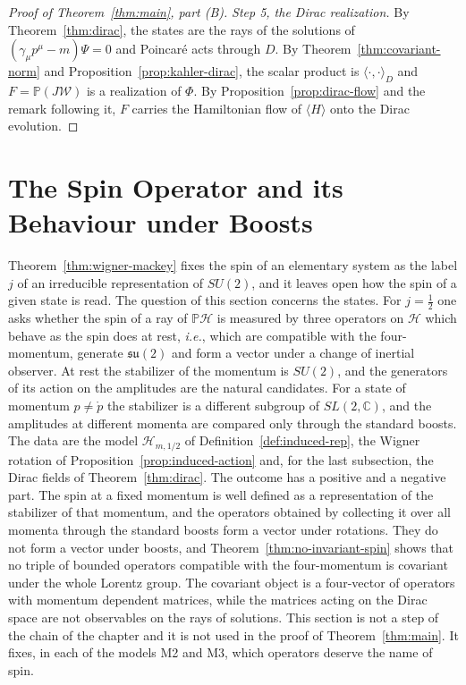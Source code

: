 \begin{proof}[Proof of Theorem~\ref{thm:main}, part (B)]
	\emph{Step 5, the Dirac realization.} By Theorem~\ref{thm:dirac}, the states are the rays of the solutions of $(\gamma_\mu p^\mu-m)\Psi=0$ and Poincar\'e acts through $D$. By Theorem~\ref{thm:covariant-norm} and Proposition~\ref{prop:kahler-dirac}, the scalar product is $\langle\cdot,\cdot\rangle_D$ and $F=\mathbb{P}(J\mathcal{W})$ is a realization of $\Phi$. By Proposition~\ref{prop:dirac-flow} and the remark following it, $F$ carries the Hamiltonian flow of $\langle H\rangle$ onto the Dirac evolution.
\end{proof}
\section{The Spin Operator and its Behaviour under Boosts}
\label{sec:spin-operator}

Theorem~\ref{thm:wigner-mackey} fixes the spin of an elementary system as the label $j$ of an irreducible representation of $SU(2)$, and it leaves open how the spin of a given state is read. The question of this section concerns the states. For $j=\frac12$ one asks whether the spin of a ray of $\mathbb{P}\mathcal{H}$ is measured by three operators on $\mathcal{H}$ which behave as the spin does at rest, \textit{i.e.}, which are compatible with the four-momentum, generate $\mathfrak{su}(2)$ and form a vector under a change of inertial observer. At rest the stabilizer of the momentum is $SU(2)$, and the generators of its action on the amplitudes are the natural candidates. For a state of momentum $p\neq\mathring{p}$ the stabilizer is a different subgroup of $SL(2,\mathbb{C})$, and the amplitudes at different momenta are compared only through the standard boosts. The data are the model $\mathcal{H}_{m,1/2}$ of Definition~\ref{def:induced-rep}, the Wigner rotation of Proposition~\ref{prop:induced-action} and, for the last subsection, the Dirac fields of Theorem~\ref{thm:dirac}. The outcome has a positive and a negative part. The spin at a fixed momentum is well defined as a representation of the stabilizer of that momentum, and the operators obtained by collecting it over all momenta through the standard boosts form a vector under rotations. They do not form a vector under boosts, and Theorem~\ref{thm:no-invariant-spin} shows that no triple of bounded operators compatible with the four-momentum is covariant under the whole Lorentz group. The covariant object is a four-vector of operators with momentum dependent matrices, while the matrices acting on the Dirac space are not observables on the rays of solutions. This section is not a step of the chain of the chapter and it is not used in the proof of Theorem~\ref{thm:main}. It fixes, in each of the models M2 and M3, which operators deserve the name of spin.

